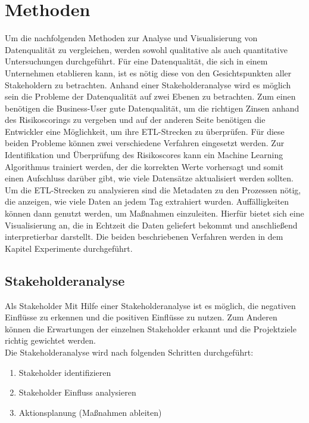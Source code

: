 \chapter{Methoden}\label{ch:method}
Um die nachfolgenden Methoden zur Analyse und Visualisierung von Datenqualität zu vergleichen, werden sowohl qualitative als auch quantitative Untersuchungen durchgeführt.
Für eine Datenqualität, die sich in einem Unternehmen etablieren kann, ist es nötig diese von den Gesichtspunkten aller Stakeholdern zu betrachten.
Anhand einer Stakeholderanalyse wird es möglich sein die Probleme der Datenqualität auf zwei Ebenen zu betrachten. 
Zum einen benötigen die Business-User gute Datenqualität, um die richtigen Zinsen anhand des Risikoscorings zu vergeben und auf der anderen Seite benötigen die Entwickler eine Möglichkeit, um ihre ETL-Strecken zu überprüfen.
Für diese beiden Probleme können zwei verschiedene Verfahren eingesetzt werden.
Zur Identifikation und Überprüfung des Risikoscores kann ein Machine Learning Algorithmus trainiert werden, der die korrekten Werte vorhersagt und somit einen Aufschluss darüber gibt, wie viele Datensätze aktualisiert werden sollten.
Um die ETL-Strecken zu analysieren sind die Metadaten zu den Prozessen nötig, die anzeigen, wie viele Daten an jedem Tag extrahiert wurden. 
Auffälligkeiten können dann genutzt werden, um Maßnahmen einzuleiten.
Hierfür bietet sich eine Visualisierung an, die in Echtzeit die Daten geliefert bekommt und anschließend interpretierbar darstellt.
Die beiden beschriebenen Verfahren werden in dem Kapitel Experimente durchgeführt. 



\section{Stakeholderanalyse}
Als Stakeholder 
Mit Hilfe einer Stakeholderanalyse ist es möglich, die negativen Einflüsse zu erkennen und die positiven Einflüsse zu nutzen.
Zum Anderen können die Erwartungen der einzelnen Stakeholder erkannt und die Projektziele richtig gewichtet werden. \\
Die Stakeholderanalyse wird nach folgenden Schritten durchgeführt: 

\begin{enumerate}
 \item Stakeholder identifizieren
 \item Stakeholder Einfluss analysieren
 \item Aktionsplanung (Maßnahmen ableiten)
\end{enumerate} \cite{salzsearch}

